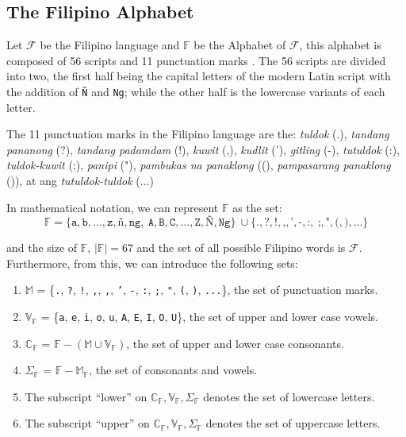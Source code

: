 \subsection{The Filipino Alphabet}
Let \(\mathcal{F}\) be the Filipino language and \(\mathbb{F}\) be the Alphabet of \(\mathcal{F}\), this alphabet is
composed of 56 scripts and 11 punctuation marks \cite{OOP}. The 56 scripts are divided into
two, the first half being the capital letters of the modern Latin script with
the addition of \texttt{Ñ} and \texttt{Ng}; while the other half is the lowercase variants
of each letter.

The 11 punctuation marks in the Filipino language are the: \textit{tuldok} (.),
\textit{tandang pananong} (?), \textit{tandang padamdam} (!), \textit{kuwit} (,),
\textit{kudlit} ('), \textit{\textit{gitling}} (-), \textit{tutuldok} (:),
\textit{tuldok-kuwit} (;), \textit{panipi} ("), \textit{pambukas na panaklong}
((), \textit{pampasarang panaklong} ()), at ang \textit{tutuldok-tuldok} (...)

In mathematical notation, we can represent \(\mathbb{F}\) as the set:
\[
    \mathbb{F} = \{\texttt{a},\texttt{b},\dots,\texttt{z},\texttt{ñ},\texttt{ng},   \
    \texttt{A},\texttt{B},\texttt{C},\dots,\texttt{Z},\texttt{Ñ},\texttt{Ng}\}         \
    \cup \{\texttt{.},\texttt{?},\texttt{!},\texttt{,},\texttt{'},\texttt{-},\texttt{:}, \
    \texttt{;},\texttt{"},\texttt{(},\texttt{)}, \texttt{...}\}
\]

and the size of \(\mathbb{F}\), \(|\mathbb{F}| = 67\) and the set of all possible Filipino words is $\mathcal{F}$. Furthermore, from this, we can introduce the following sets:
\begin{enumerate}
    \item \(\mathbb{M}\) = \{\texttt{.}, \texttt{?}, \texttt{!}, \texttt{,}, \texttt{,}, \texttt{'}, \texttt{-}, \texttt{:}, \texttt{;}, \texttt{"}, \texttt{(}, \texttt{)}, \texttt{...}\}, the set of punctuation marks.
    \item \(\mathbb{V}_\mathbb{F}\) = \{\texttt{a}, \texttt{e}, \texttt{i}, \texttt{o}, \texttt{u}, \texttt{A}, \texttt{E}, \texttt{I}, \texttt{O}, \texttt{U}\}, the set of upper and lower case vowels.
    \item \(\mathbb{C}_\mathbb{F}\) = \(\mathbb{F} - (\mathbb{M} \cup \mathbb{V}_\mathbb{F})\),
          the set of upper and lower case consonants.
    \item \(\Sigma_\mathbb{F}\) = \(\mathbb{F} - \mathbb{M}_\mathbb{F}\), the set of consonants and vowels.
    \item The subscript “lower” on \(\mathbb{C}_\mathbb{F}, \mathbb{V}_\mathbb{F}, \Sigma_\mathbb{F}\) denotes the set of lowercase letters.
    \item The subscript “upper” on \(\mathbb{C}_\mathbb{F}, \mathbb{V}_\mathbb{F}, \Sigma_\mathbb{F}\) denotes the set of uppercase letters.
\end{enumerate}

